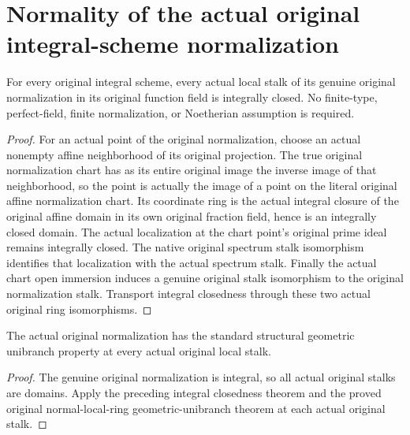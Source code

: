 \section{Normality of the actual original integral-scheme normalization}

\begin{theorem}
\label{thm:actual-integral-scheme-normalization-normal-stalks}
\leanok
{}
For every original integral scheme, every actual local stalk of
its genuine original normalization in its original function field
is integrally closed. No finite-type, perfect-field, finite
normalization, or Noetherian assumption is required.
\end{theorem}
\begin{proof}
For an actual point of the original normalization, choose an
actual nonempty affine neighborhood of its original projection.
The true original normalization chart has as its entire original
image the inverse image of that neighborhood, so the point is
actually the image of a point on the literal original affine
normalization chart. Its coordinate ring is the actual integral
closure of the original affine domain in its own original fraction
field, hence is an integrally closed domain. The actual localization
at the chart point's original prime ideal remains integrally
closed. The native original spectrum stalk isomorphism identifies
that localization with the actual spectrum stalk. Finally the
actual chart open immersion induces a genuine original stalk
isomorphism to the original normalization stalk. Transport integral
closedness through these two actual original ring isomorphisms.
\end{proof}

\begin{corollary}
\label{cor:actual-integral-scheme-normalization-unibranch}
\leanok
{}
The actual original normalization has the standard structural
geometric unibranch property at every actual original local stalk.
\end{corollary}
\begin{proof}
The genuine original normalization is integral, so all actual
original stalks are domains. Apply the preceding integral
closedness theorem and the proved original normal-local-ring
geometric-unibranch theorem at each actual original stalk.
\end{proof}
